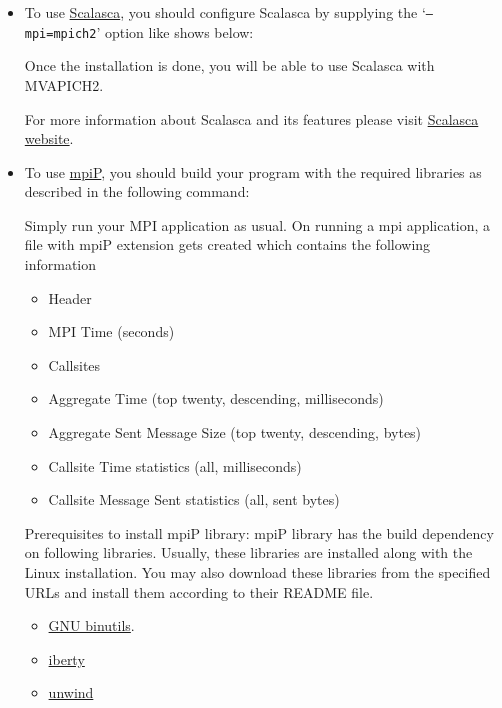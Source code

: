 \begin{itemize}
\item To use \href{http://www.scalasca.org}{Scalasca}, you should
configure Scalasca by supplying the `\texttt{--mpi=mpich2}' option
like shows below:\\

Once the installation is done, you will be able to use Scalasca with MVAPICH2.

For more information about Scalasca and its features please visit
\href{http://www.scalasca.org}{Scalasca website}.

\item To use \href{http://sourceforge.net/projects/mpip}{mpiP}, you should build 
your program with the required libraries as described in the following command:\\

Simply run your MPI application as usual. On running a mpi application, a file with mpiP extension gets created which contains the following information
\begin{itemize}
    \item Header
    \item MPI Time (seconds)
    \item Callsites
    \item Aggregate Time (top twenty, descending, milliseconds)
    \item Aggregate Sent Message Size (top twenty, descending, bytes)
    \item Callsite Time statistics (all, milliseconds)
    \item Callsite Message Sent statistics (all, sent bytes)
\end{itemize}

Prerequisites to install mpiP library: mpiP library has the build dependency on following libraries. Usually, these libraries are installed along with the Linux installation. 
You may also download these libraries from the specified URLs and install them according to their README file.
\begin{itemize}
    \item \href{http://sources.redhat.com/binutils}{GNU binutils}. 
    \item \href{https://gcc.gnu.org/onlinedocs/libiberty}{iberty}
    \item \href{https://pkgs.org/download/libunwind}{unwind} 
\end{itemize}


\end{itemize}
